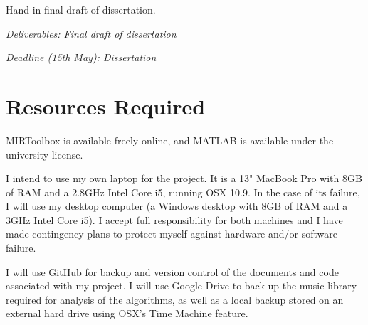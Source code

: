 \documentclass[12pt]{article}
\begin{document}
Hand in final draft of dissertation. 

\emph{Deliverables: Final draft of dissertation}

\emph{Deadline (15th May): Dissertation}


\section*{Resources Required}

 MIRToolbox is available freely online, and MATLAB is available under the university license.

I intend to use my own laptop for the project. It is a 13" MacBook Pro with 8GB of RAM and a 2.8GHz Intel Core i5, running OSX 10.9. In the case of its failure, I will use my desktop computer (a Windows desktop with 8GB of RAM and a 3GHz Intel Core i5). I accept full responsibility for both machines and I have made contingency plans to protect myself against hardware and/or software failure.

I will use GitHub for backup and version control of the documents and code associated with my project. I will use Google Drive to back up the music library required for analysis of the algorithms, as well as a local backup stored on an external hard drive using OSX's Time Machine feature.
\end{document}
